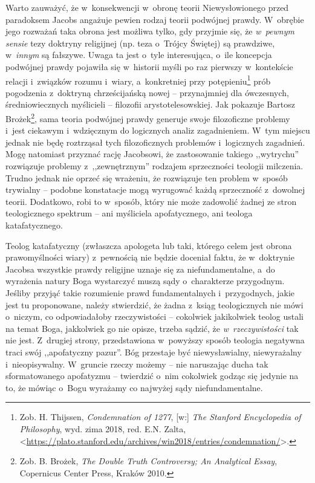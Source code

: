 Warto zauważyć, że w~konsekwencji w~obronę teorii Niewysłowionego przed paradoksem Jacobs angażuje pewien rodzaj teorii podwójnej prawdy. W~obrębie jego rozważań taka obrona jest możliwa tylko, gdy przyjmie się, że \textit{w~pewnym sensie} tezy doktryny religijnej (np. teza o~Trójcy Świętej) są prawdziwe, w~\textit{innym} są fałszywe. Uwaga ta jest o~tyle interesująca, o~ile koncepcja podwójnej prawdy pojawiła się w~historii myśli po raz pierwszy w~kontekście relacji i~związków rozumu i~wiary, a~konkretniej przy potępieniu\footnote{Zob. H. Thijssen, \textit{Condemnation of 1277}, [w:] \textit{The Stanford Encyclopedia of Philosophy}, wyd. zima 2018, red. E.N. Zalta, {\textless}\url{https://plato.stanford.edu/archives/win2018/entries/condemnation/}{\textgreater}.} prób pogodzenia z~doktryną chrześcijańską nowej -- przynajmniej dla ówczesnych, średniowiecznych myślicieli -- filozofii arystotelesowskiej. Jak pokazuje Bartosz Brożek\footnote{Zob. B. Brożek, \textit{The Double Truth Controversy; An Analytical Essay}, Copernicus Center Press, Kraków 2010.}, sama teoria podwójnej prawdy generuje swoje filozoficzne problemy i~jest ciekawym i~wdzięcznym do logicznych analiz zagadnieniem. W~tym miejscu jednak nie będę roztrząsał tych filozoficznych problemów i~logicznych zagadnień. Mogę natomiast przyznać rację Jacobsowi, że zastosowanie takiego ,,wytrychu'' rozwiązuje problemy z~,,zewnętrznym'' rodzajem sprzeczności teologii milczenia. Trudno jednak nie oprzeć się wrażeniu, że rozwiązuje ten problem w~sposób trywialny -- podobne konstatacje mogą wyrugować każdą sprzeczność z~dowolnej teorii. Dodatkowo, robi to w~sposób, który nie może zadowolić żadnej ze stron teologicznego spektrum -- ani myśliciela apofatycznego, ani teologa katafatycznego.

Teolog katafatyczny (zwłaszcza apologeta lub taki, którego celem jest obrona prawomyślności wiary) z~pewnością nie będzie doceniał faktu, że w~doktrynie Jacobsa wszystkie prawdy religijne uznaje się za niefundamentalne, a~do wyrażenia natury Boga wystarczyć muszą sądy o~charakterze przygodnym. Jeśliby przyjąć takie rozumienie prawd fundamentalnych i~przygodnych, jakie jest tu proponowane, należy stwierdzić, że żadna z~ksiąg teologicznych nie mówi o~niczym, co odpowiadałoby rzeczywistości -- cokolwiek jakikolwiek teolog ustali na temat Boga, jakkolwiek go nie opisze, trzeba sądzić, że \textit{w~rzeczywistości} tak nie jest. Z~drugiej strony, przedstawiona w~powyższy sposób teologia negatywna traci swój ,,apofatyczny pazur''. Bóg przestaje być niewysławialny, niewyrażalny i~nieopisywalny. W~gruncie rzeczy możemy -- nie naruszając ducha tak sformatowanego apofatyzmu -- twierdzić o~nim cokolwiek godząc się jedynie na to, że mówiąc o~Bogu wyrażamy co najwyżej sądy niefundamentalne.

